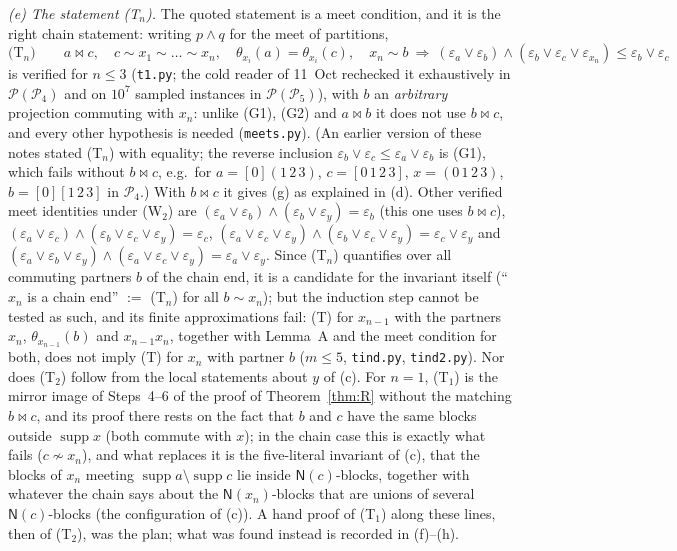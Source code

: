 \documentclass[11pt]{amsart}
\theoremstyle{definition}
\renewcommand{\P}{\mathcal{P}}
\newcommand{\supp}{\operatorname{supp}}
\newcommand{\N}{\mathsf{N}}
\newcommand{\mt}{\bowtie}   %
\begin{document}
\emph{(e) The statement (T$_n$).} The quoted statement is a meet condition, and it is the right chain statement: writing $p\wedge q$ for the meet of partitions,
\[
\text{(T$_n$)}\qquad a\mt c,\quad c\sim x_1\sim\dots\sim x_n,\quad \theta_{x_i}(a)=\theta_{x_i}(c),\quad x_n\sim b\ \Longrightarrow\ (\varepsilon_a\vee\varepsilon_b)\wedge(\varepsilon_b\vee\varepsilon_c\vee\varepsilon_{x_n})\le\varepsilon_b\vee\varepsilon_c
\]
is verified for $n\le3$ (\texttt{t1.py}; the cold reader of 11~Oct rechecked it exhaustively in $\P(\P_4)$ and on $10^7$ sampled instances in $\P(\P_5)$), with $b$ an \emph{arbitrary} projection commuting with $x_n$: unlike (G1), (G2) and $a\mt b$ it does not use $b\mt c$, and every other hypothesis is needed (\texttt{meets.py}). (An earlier version of these notes stated (T$_n$) with equality; the reverse inclusion $\varepsilon_b\vee\varepsilon_c\le\varepsilon_a\vee\varepsilon_b$ is (G1), which fails without $b\mt c$, e.g.\ for $a=[0](1\,2\,3)$, $c=[0\,1\,2\,3]$, $x=(0\,1\,2\,3)$, $b=[0][1\,2\,3]$ in $\P_4$.) With $b\mt c$ it gives (g) as explained in (d). Other verified meet identities under (W$_2$) are $(\varepsilon_a\vee\varepsilon_b)\wedge(\varepsilon_b\vee\varepsilon_y)=\varepsilon_b$ (this one uses $b\mt c$), $(\varepsilon_a\vee\varepsilon_c)\wedge(\varepsilon_b\vee\varepsilon_c\vee\varepsilon_y)=\varepsilon_c$, $(\varepsilon_a\vee\varepsilon_c\vee\varepsilon_y)\wedge(\varepsilon_b\vee\varepsilon_c\vee\varepsilon_y)=\varepsilon_c\vee\varepsilon_y$ and $(\varepsilon_a\vee\varepsilon_b\vee\varepsilon_y)\wedge(\varepsilon_a\vee\varepsilon_c\vee\varepsilon_y)=\varepsilon_a\vee\varepsilon_y$. Since (T$_n$) quantifies over all commuting partners $b$ of the chain end, it is a candidate for the invariant itself (``$x_n$ is a chain end'' $:=$ (T$_n$) for all $b\sim x_n$); but the induction step cannot be tested as such, and its finite approximations fail: (T) for $x_{n-1}$ with the partners $x_n$, $\theta_{x_{n-1}}(b)$ and $x_{n-1}x_n$, together with Lemma~A and the meet condition for both, does not imply (T) for $x_n$ with partner $b$ ($m\le5$, \texttt{tind.py}, \texttt{tind2.py}). Nor does (T$_2$) follow from the local statements about $y$ of (c). For $n=1$, (T$_1$) is the mirror image of Steps~4--6 of the proof of Theorem~\ref{thm:R} without the matching $b\mt c$, and its proof there rests on the fact that $b$ and $c$ have the same blocks outside $\supp x$ (both commute with $x$); in the chain case this is exactly what fails ($c\not\sim x_n$), and what replaces it is the five-literal invariant of (c), that the blocks of $x_n$ meeting $\supp a\setminus\supp c$ lie inside $\N(c)$-blocks, together with whatever the chain says about the $\N(x_n)$-blocks that are unions of several $\N(c)$-blocks (the configuration of (c)). A hand proof of (T$_1$) along these lines, then of (T$_2$), was the plan; what was found instead is recorded in (f)--(h).
\end{document}
